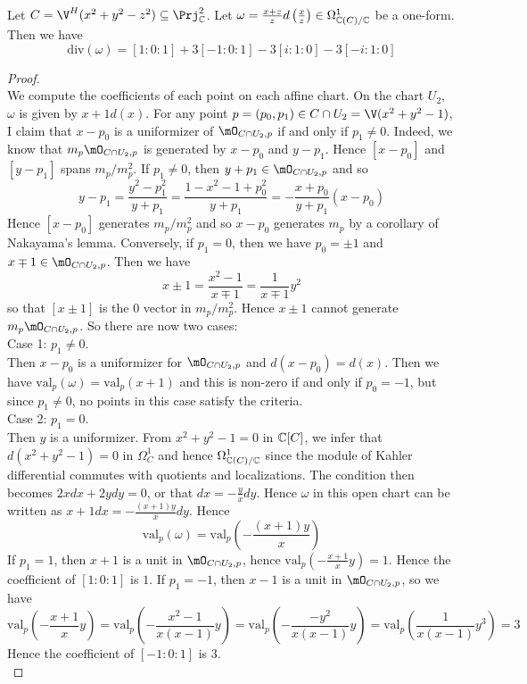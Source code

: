 \documentclass[a4paper]{article}
\begin{document}
\begin{eg}{}{}\\
Let $C=\V^H(x^2+y^2-z^2)\subseteq\Prj_\C^2$. Let $\omega=\frac{x+z}{z}d\left(\frac{x}{z}\right)\in\Omega_{\mathbb{C}(C)/\mathbb{C}}^1$ be a one-form. Then we have $$\text{div}(\omega)=[1:0:1]+3[-1:0:1]-3[i:1:0]-3[-i:1:0]$$
\begin{proof}\\
We compute the coefficients of each point on each affine chart. On the chart $U_2$, $\omega$ is given by $x+1d(x)$. For any point $p=(p_0,p_1)\in C\cap U_2=\V(x^2+y^2-1)$, I claim that $x-p_0$ is a uniformizer of $\mO_{C\cap U_2,p}$ if and only if $p_1\neq 0$. Indeed, we know that $m_p\mO_{C\cap U_2,p}$ is generated by $x-p_0$ and $y-p_1$. Hence $[x-p_0]$ and $[y-p_1]$ spans $m_p/m_p^2$. If $p_1\neq 0$, then $y+p_1\in\mO_{C\cap U_2,p}$ and so $$y-p_1=\frac{y^2-p_1^2}{y+p_1}=\frac{1-x^2-1+p_0^2}{y+p_1}=-\frac{x+p_0}{y+p_1}(x-p_0)$$ Hence $[x-p_0]$ generates $m_p/m_p^2$ and so $x-p_0$ generates $m_p$ by a corollary of Nakayama's lemma. Conversely, if $p_1=0$, then we have $p_0=\pm1$ and $x\mp1\in\mO_{C\cap U_2,p}$. Then we have $$x\pm1=\frac{x^2-1}{x\mp1}=\frac{1}{x\mp1}y^2$$ so that $[x\pm 1]$ is the $0$ vector in $m_p/m_p^2$. Hence $x\pm 1$ cannot generate $m_p\mO_{C\cap U_2,p}$. So there are now two cases: \\

Case 1: $p_1\neq 0$. \\
Then $x-p_0$ is a uniformizer for $\mO_{C\cap U_2,p}$ and $d(x-p_0)=d(x)$. Then we have $\text{val}_p(\omega)=\text{val}_p(x+1)$ and this is non-zero if and only if $p_0=-1$, but since $p_1\neq 0$, no points in this case satisfy the criteria. \\

Case 2: $p_1=0$. \\
Then $y$ is a uniformizer. From $x^2+y^2-1=0$ in $\mathbb{C}[C]$, we infer that $d(x^2+y^2-1)=0$ in $\Omega_C^1$ and hence $\Omega_{\mathbb{C}(C)/\mathbb{C}}^1$ since the module of Kahler differential commutes with quotients and localizations. The condition then becomes $2xdx+2ydy=0$, or that $dx=-\frac{y}{x}dy$. Hence $\omega$ in this open chart can be written as $x+1dx=-\frac{(x+1)y}{x}dy$. Hence $$\text{val}_p(\omega)=\text{val}_p\left(-\frac{(x+1)y}{x}\right)$$ If $p_1=1$, then $x+1$ is a unit in $\mO_{C\cap U_2,p}$, hence $\text{val}_p\left(-\frac{x+1}{x}y\right)=1$. Hence the coefficient of $[1:0:1]$ is $1$. If $p_1=-1$, then $x-1$ is a unit in $\mO_{C\cap U_2,p}$, so we have $$\text{val}_p\left(-\frac{x+1}{x}y\right)=\text{val}_p\left(-\frac{x^2-1}{x(x-1)}y\right)=\text{val}_p\left(-\frac{-y^2}{x(x-1)}y\right)=\text{val}_p\left(\frac{1}{x(x-1)}y^3\right)=3$$ Hence the coefficient of $[-1:0:1]$ is $3$. \\


\end{proof}
\end{eg}
\end{document}

